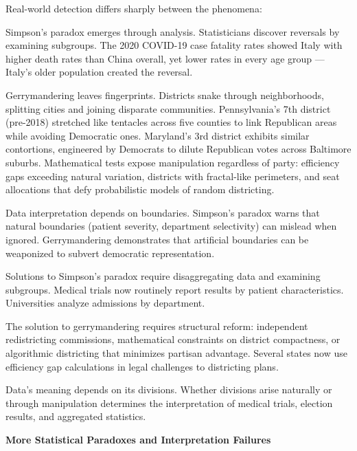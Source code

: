 Real-world detection differs sharply between the phenomena:

Simpson's paradox emerges through analysis. Statisticians discover reversals by examining subgroups. The 2020 COVID-19 case fatality rates showed Italy with higher death rates than China overall, yet lower rates in every age group — Italy's older population created the reversal.

Gerrymandering leaves fingerprints. Districts snake through neighborhoods, splitting cities and joining disparate communities. Pennsylvania's 7th district (pre-2018) stretched like tentacles across five counties to link Republican areas while avoiding Democratic ones. Maryland's 3rd district exhibits similar contortions, engineered by Democrats to dilute Republican votes across Baltimore suburbs. Mathematical tests expose manipulation regardless of party: efficiency gaps exceeding natural variation, districts with fractal-like perimeters, and seat allocations that defy probabilistic models of random districting.

Data interpretation depends on boundaries. Simpson's paradox warns that natural boundaries (patient severity, department selectivity) can mislead when ignored. Gerrymandering demonstrates that artificial boundaries can be weaponized to subvert democratic representation.

Solutions to Simpson's paradox require disaggregating data and examining subgroups. Medical trials now routinely report results by patient characteristics. Universities analyze admissions by department.

The solution to gerrymandering requires structural reform: independent redistricting commissions, mathematical constraints on district compactness, or algorithmic districting that minimizes partisan advantage. Several states now use efficiency gap calculations in legal challenges to districting plans.

Data's meaning depends on its divisions. Whether divisions arise naturally or through manipulation determines the interpretation of medical trials, election results, and aggregated statistics.


\vspace*{\fill}

\clearpage



\begin{center}
{\Large \textbf{More Statistical Paradoxes and Interpretation Failures}}

\end{center}

